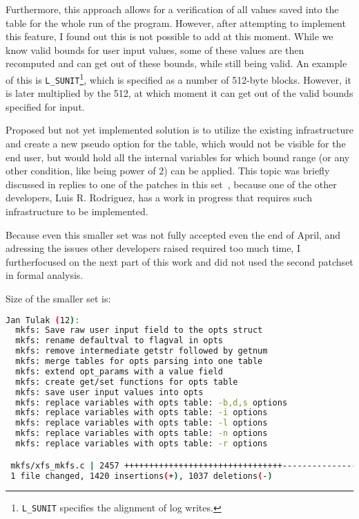 Furthermore, this approach allows for a verification of all values saved into
the table for the whole run of the program. However, after attempting to
implement this feature, I found out this is not possible to add at this moment.
While we know valid bounds for user input values, some of these values are then
recomputed and can get out of these bounds, while still being valid. An example
of this is {\tt L\_SUNIT}\footnote{{\tt L\_SUNIT} specifies the alignment of
log writes.}, which is specified as a number of 512-byte blocks. However, it is
later multiplied by the 512, at which moment it can get out of the valid bounds
specified for input.

Proposed but not yet implemented solution is to utilize the existing
infrastructure and create a new pseudo option for the table, which would not be
visible for the end user, but would hold all the internal variables for which
bound range (or any other condition, like being power of 2) can be applied.
This topic was briefly discussed in replies to one of the patches in this
set~\cite{secondSetSplitOtherVars}, because one of the other developers, Luis
R. Rodriguez, has a work in progress that requires such infrastructure to be
implemented.

Because even this smaller set was not fully accepted even the end of April,
and adressing the issues other developers raised required too much time, I
furtherfocused on the next part of
this work and did not used the second patchset in formal analysis.

Size of the smaller set is:
\begin{lstlisting}[frame=none, basicstyle=\footnotesize\ttfamily, language=Bash, numbers=none, numberstyle=\tiny\color{black},caption= {Git statistics for the first part of the second set after its breaking into smaller parts~\cite{secondSetSplitFirst}.}]
Jan Tulak (12):
  mkfs: Save raw user input field to the opts struct
  mkfs: rename defaultval to flagval in opts
  mkfs: remove intermediate getstr followed by getnum
  mkfs: merge tables for opts parsing into one table
  mkfs: extend opt_params with a value field
  mkfs: create get/set functions for opts table
  mkfs: save user input values into opts
  mkfs: replace variables with opts table: -b,d,s options
  mkfs: replace variables with opts table: -i options
  mkfs: replace variables with opts table: -l options
  mkfs: replace variables with opts table: -n options
  mkfs: replace variables with opts table: -r options

 mkfs/xfs_mkfs.c | 2457 ++++++++++++++++++++++++++++++++-----------------------
 1 file changed, 1420 insertions(+), 1037 deletions(-)
\end{lstlisting}


